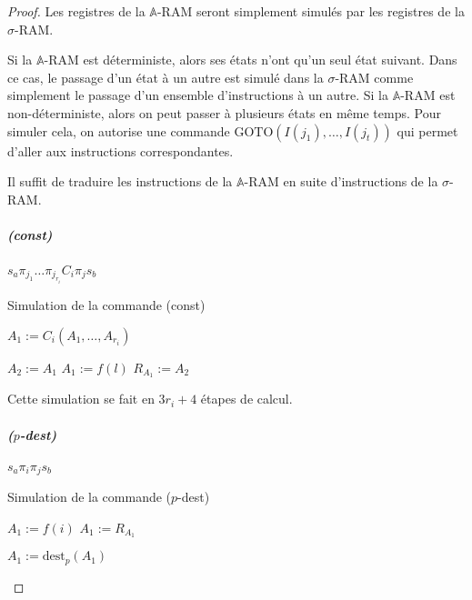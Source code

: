 \documentclass{report}
\newcommand{\bbA}{\mathbb{A}}
\begin{document}
				\begin{proof}
					Les registres de la $\bbA$-RAM seront simplement simulés par les registres de la $\sigma$-RAM. 
					
					Si la $\bbA$-RAM est déterministe, alors ses états n'ont qu'un seul état suivant. Dans ce cas, le passage d'un état à un autre est simulé dans la $\sigma$-RAM comme simplement le passage d'un ensemble d'instructions à un autre. Si la $\bbA$-RAM est non-déterministe, alors on peut passer à plusieurs états en même temps. Pour simuler cela, on autorise une commande $\text{GOTO}(I(j_1), \dots, I(j_t))$ qui permet d'aller aux instructions correspondantes. 
					
					Il suffit de traduire les instructions de la $\bbA$-RAM en suite d'instructions de la $\sigma$-RAM.
					
					\subparagraph{(const)}
					$s_a \pi_{j_1} \dots \pi_{j_{r_i}} C_i \pi_j s_b$
					
					
					
					
					\begin{algorithm}[H]
						\caption{Simulation de la commande (const)}
						
						
							
						
						$A_1 := C_i (A_1, \dots, A_{r_i})$\;
						
						
						$A_2 := A_1$\;
						$A_1 := f(l)$\;
						$R_{A_1} := A_2$\;
					\end{algorithm}
					
					\espace
					
					Cette simulation se fait en $3r_i + 4$ étapes de calcul.

					
					\subparagraph{($p$-dest)}
					$s_a \pi_i \pi_j s_b$
					
					\begin{algorithm}[H]
						\caption{Simulation de la commande ($p$-dest)}
						
						$A_1 := f(i)$\;
						$A_1 := R_{A_1}$\;
						
						$A_1 := \text{dest}_p(A_1)$\;
						

\end{algorithm}
\end{proof}
\end{document}

